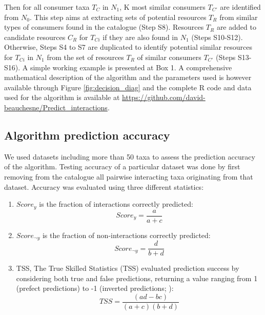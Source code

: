\documentclass[letterpaper]{article}
\begin{document}
Then for all consumer taxa $T_C$ in $N_1$, K most similar consumers $T_{C'}$ are identified from $N_0$. This step aims at extracting sets of potential resources $T_R$ from similar types of consumers found in the catalogue (Step S8). Resources $T_R$ are added to candidate resources $C_R$ for $T_{Ci}$ if they are also found in $N_1$ (Steps S10-S12). Otherwise, Steps S4 to S7 are duplicated to identify potential similar resources for $T_{Ci}$ in $N_1$ from the set of resources $T_R$ of similar consumers $T_{C'}$ (Steps S13-S16). A simple working example is presented at Box 1. A comprehensive mathematical description of the algorithm and the parameters used is however available through Figure \ref{fig:decision_diag} and the complete R code and data used for the algorithm is available at \href{https://github.com/david-beauchesne/Predict_interactions}{https://github.com/david-beauchesne/Predict\_interactions}.

\subsection{Algorithm prediction accuracy}
We used datasets including more than 50 taxa \citep{Christian1999, Link2002, Thompson2004, Brose2005, Barnes2008, Kortsch2015} to assess the prediction accuracy of the algorithm. Testing accuracy of a particular dataset was done by first removing from the catalogue all pairwise interacting taxa originating from that dataset. Accuracy was evaluated using three different statistics:

\begin{enumerate}
 \item $Score_y$ is the fraction of interactions correctly predicted:
     \begin{equation}
         Score_y = \frac{a}{a + c}
     \end{equation}

 \item $Score_{\neg y}$ is the fraction of non-interactions correctly predicted:
     \begin{equation}
       Score_{\neg y}  = \frac{d}{b + d}
     \end{equation}

 \item TSS, The True Skilled Statistics (TSS) evaluated prediction success by considering both true and false predictions, returning a value ranging from 1 (prefect predictions) to -1 (inverted predictions; \cite{Allouche2006}):
     \begin{equation}
       TSS = \frac{(ad - bc)}{(a + c)(b + d)}
     \end{equation}
\end{enumerate}
\end{document}
